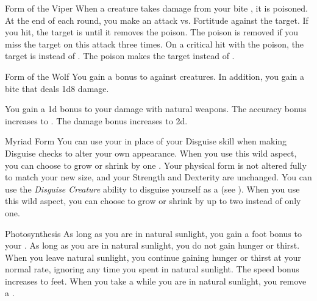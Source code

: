 {\begin{freeability}{Form of the Viper}
                \rankline
                 When a creature takes damage from your bite , it is poisoned.
                At the end of each round, you make an attack vs. Fortitude against the target.
                If you hit, the target is  until it removes the poison.
                The poison is removed if you miss the target on this attack three times.
                 On a critical hit with the poison, the target is  instead of .
                 The poison makes the target  instead of .
            \end{freeability}

            \begin{freeability}{Form of the Wolf}
                You gain a  bonus to  against  creatures.
                In addition, you gain a bite  that deals 1d8 damage.

                \rankline
                 You gain a \plus1d bonus to your damage with natural weapons.
                 The accuracy bonus increases to .
                 The damage bonus increases to \plus2d.
            \end{freeability}

            \begin{freeability}{Myriad Form}
                You can use your  in place of your Disguise skill when making Disguise checks to alter your own appearance.
                \rankline
                 When you use this wild aspect, you can choose to grow or shrink by one .
                    Your physical form is not altered fully to match your new size, and your Strength and Dexterity are unchanged.
                 You can use the \textit{Disguise Creature} ability to disguise yourself as a  (see ).
                 When you use this wild aspect, you can choose to grow or shrink by up to two  instead of only one.
            \end{freeability}

            \begin{freeability}{Photosynthesis}
                As long as you are in natural sunlight, you gain a  foot bonus to your .
                \rankline
                 As long as you are in natural sunlight, you do not gain hunger or thirst.
                When you leave natural sunlight, you continue gaining hunger or thirst at your normal rate, ignoring any time you spent in natural sunlight.
                 The speed bonus increases to  feet.
                 When you take a  while you are in natural sunlight, you remove a .
            \end{freeability}

}

